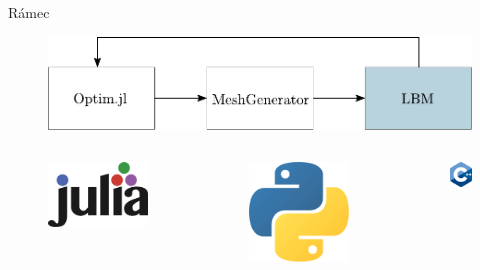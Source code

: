 \documentclass[aspectratio=169,xcolor=dvipsnames]{beamer}
\begin{document}
\begin{frame}{Rámec}
	\addtocounter{framenumber}{-1}
	\begin{figure}
		\includegraphics[width=0.9\linewidth, trim={0 -0.1cm 0 0}, clip]{Images/pipeline3.pdf}
	\end{figure}
	\vspace{-2mm}
	\begin{columns}[T] %
		\begin{column}{.31\textwidth}
			\begin{figure}
				\includegraphics[width=0.5\linewidth, trim={0 0 0 0}, clip]{Images/julia.png}
			\end{figure}
		\end{column}%
		\begin{column}{.31\textwidth}
			\begin{figure}
				\includegraphics[width=0.35\linewidth, trim={0 0 0 0cm}, clip]{Images/python.png}
			\end{figure}
		\end{column}%
		\begin{column}{.31\textwidth}
			\begin{figure}
				\includegraphics[width=0.35\linewidth, trim={0 0 0 0cm}, clip]{Images/cpp.png}
			\end{figure}
		\end{column}%
	\end{columns}
\end{frame}
\end{document}
